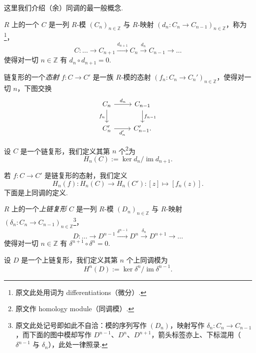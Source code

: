 这里我们介绍（余）同调的最一般概念.

\begin{definition}\label{c4-def-1-4}
$R$ 上的一个 $C$ 是一列 $R$-模 $(C_n)_{n\in\mathbb Z}$ 与 $R$-映射 $(d_n:C_n\to C_{n-1})_{n\in\mathbb Z}$，称为\footnote{原文此处用词为 differentiations（微分）.}，
\[
C:\ldots\to C_{n+1}\xrightarrow{d_{n+1}}C_n\xrightarrow{d_n}C_{n-1}\to\ldots
\]
使得对一切 $n\in\mathbb Z$ 有 $d_n\circ d_{n+1}=0$.
\end{definition}

\begin{definition}\label{c4-def-1-5}
链复形的一个\emph{态射} $f:C\to C'$ 是一族 $R$-模的态射 $(f_n:C_n\to C_n')_{n\in\mathbb Z}$，使得对一切 $n$，下图交换
\[
\begin{tikzcd}
C_n \arrow[d,"f_n"'] \arrow[r,"d_n"] & C_{n-1} \arrow[d,"f_{n-1}"] \\
C_n' \arrow[r,"d_n'"'] & C_{n-1}'.
\end{tikzcd}
\]
\end{definition}

\begin{definition}\label{c4-def-1-6}
设 $C$ 是一个链复形，我们定义其第 $n$ 个\footnote{原文作 homology module（同调模）.}为
\[
H_n(C):=\ker d_n/\operatorname{im} d_{n+1}.
\]
\end{definition}

若 $f:C\to C'$ 是链复形的态射，我们定义
\[
H_n(f):H_n(C)\to H_n(C'):[z]\mapsto[f_n(z)].
\]
下面是上同调的定义.

\begin{definition}\label{c4-def-1-7}
$R$ 上的一个\emph{上链复形} $C$ 是一列 $R$-模 $(D_n)_{n\in\mathbb Z}$ 与 $R$-映射 $(\delta_n:C_n\to C_{n-1})_{n\in\mathbb Z}$\footnote{原文此处记号即如此不自洽：模的序列写作 $(D_n)$，映射写作 $\delta_n:C_n\to C_{n-1}$，而下面的图中模却写作 $D^{n-1}$、$D^n$、$D^{n+1}$，箭头标签亦上、下标混用（$\delta^{n-1}$ 与 $\delta_n$），此处一律照录.}，
\[
D:\ldots\to D^{n-1}\xrightarrow{\delta^{n-1}}D^n\xrightarrow{\delta_n}D^{n+1}\to\ldots
\]
使得对一切 $n\in\mathbb Z$ 有 $\delta^{n+1}\circ\delta^n=0$.
\end{definition}

\begin{definition}\label{c4-def-1-8}
设 $D$ 是一个上链复形，我们定义其第 $n$ 个上同调模为
\[
H^n(D):=\ker\delta^n/\operatorname{im}\delta^{n-1}.
\]
\end{definition}

